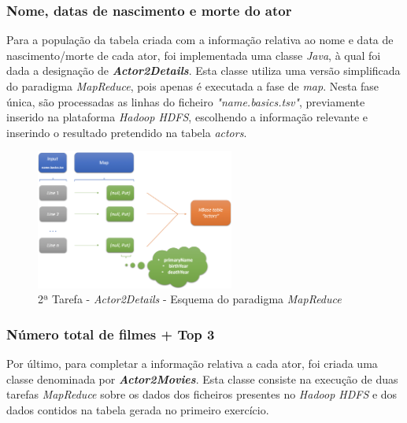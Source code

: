 \documentclass[a4paper]{report}
\begin{document}
{			\subsubsection{Nome, datas de nascimento e morte do ator} \label{sssec:Task2-3-1}
			Para a população da tabela criada com a informação relativa ao nome e data de nascimento/morte de cada ator, foi implementada uma classe \textit{Java}, à qual foi dada a designação de \textbf{\textit{Actor2Details}}.
			Esta classe utiliza uma versão simplificada do paradigma \textit{MapReduce}, pois apenas é executada a fase de \textit{map}.
			Nesta fase única, são processadas as linhas do ficheiro \textit{"name.basics.tsv"}, previamente inserido na plataforma \textit{Hadoop HDFS}, escolhendo a informação relevante e inserindo o resultado pretendido na tabela \textit{actors}.
			\begin{figure}[H]
				\centering
				\includegraphics[width=0.58\textwidth]{Imagens/2ª Tarefa - Actor2Details - Esquema MapReduce.png}
				\caption{2ª Tarefa - \textit{Actor2Details} - Esquema do paradigma \textit{MapReduce}}
				\label{fig:18}
			\end{figure}

			\subsubsection{Número total de filmes + Top 3} \label{sssec:Task2-3-2}
			Por último, para completar a informação relativa a cada ator, foi criada uma classe denominada por \textbf{\textit{Actor2Movies}}. Esta classe consiste na execução de duas tarefas \textit{MapReduce} sobre os dados dos ficheiros presentes no \textit{Hadoop HDFS} e dos dados contidos na tabela gerada no primeiro exercício.
			
}
\end{document}

